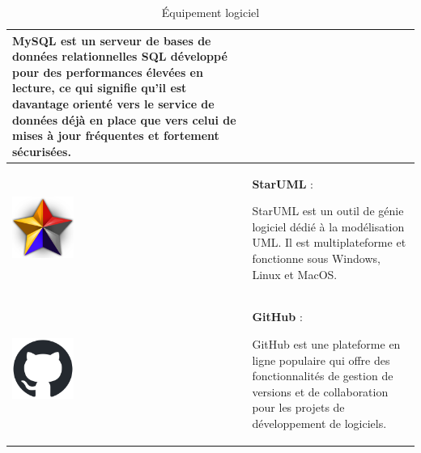 \documentclass{article}
\begin{document}
\begin{table}[h!]
\begin{tabular}{|m{2cm}|m{15cm}|}
                            MySQL est un serveur de bases de données relationnelles SQL développé pour des performances élevées en lecture, ce qui signifie qu'il est davantage orienté vers le service de données déjà en place que vers celui de mises à jour fréquentes et fortement sécurisées. \\
                            \hline
                            \includegraphics[width=2cm]{assets/logos/staruml-icon.png} &
                            \textbf{StarUML} :
                            
                            StarUML est un outil de génie logiciel dédié à la modélisation UML. Il est multiplateforme et fonctionne sous Windows, Linux et MacOS. \\
                            \hline
                            \includegraphics[width=2cm]{assets/logos/github-mark.png} &
                            \textbf{GitHub} :
                            
                            GitHub est une plateforme en ligne populaire qui offre des fonctionnalités de gestion de versions et de collaboration pour les projets de développement de logiciels. \\
                            \hline
                        \end{tabular}
                        \caption{Équipement logiciel}
                    \end{table}
                \FloatBarrier
                \newpage
\end{document}
